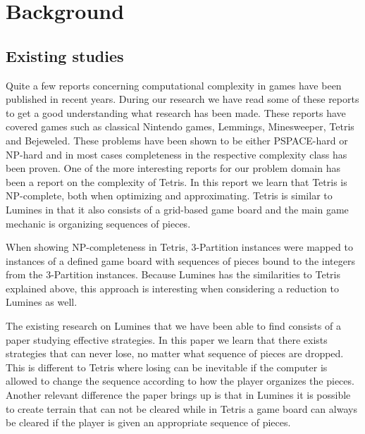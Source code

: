 \section{Background}
\subsection{Existing studies}

Quite a few reports concerning computational complexity in games have been published in recent years. During our research we have read some of these reports to get a good understanding what research has been made. These reports have covered games such as classical Nintendo games, 
Lemmings, Minesweeper, Tetris and Bejeweled. These problems have been shown to be either PSPACE-hard or NP-hard and in most cases completeness in the respective complexity class has been proven.
One of the more interesting reports for our problem domain has been a report on the complexity of Tetris. In this report we learn that Tetris is NP-complete, both when optimizing and approximating. Tetris is similar to Lumines in that it also consists of a grid-based game board and the main game mechanic is organizing sequences of pieces.

When showing NP-completeness in Tetris, 3-Partition instances were mapped to instances of a defined game board with sequences of pieces bound to the integers from the 3-Partition instances. Because Lumines has the similarities to Tetris explained above, this approach is interesting when considering a reduction to Lumines as well.

The existing research on Lumines that we have been able to find consists of a paper studying effective strategies. In this paper we learn that there exists strategies that can never lose, no matter what sequence of pieces are dropped. This is different to Tetris where losing can be inevitable if the computer is allowed to change the sequence according to how the player organizes the pieces. Another relevant difference the paper brings up is that in Lumines it is possible to create terrain that can not be cleared while in Tetris a game board can always be cleared if the player is given an appropriate sequence of pieces.


